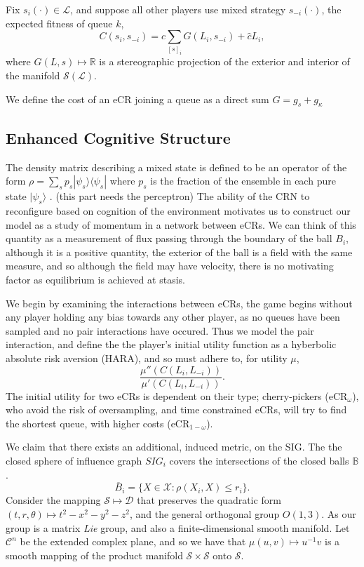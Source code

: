 \documentclass[10pt]{article}
\newcommand{\mcL}{\mathcal{L}}
\newcommand{\mcX}{\mathcal{X}}
\newcommand{\mcC}{\mathcal{C}}
\newcommand{\mcS}{\mathcal{S}}
\newcommand{\mcD}{\mathcal{D}}
\theoremstyle{definition}
\begin{document}
{Fix $s_i(\cdot) \in \mcL$, and suppose all other players use mixed strategy
$s_{-i}(\cdot)$, the expected fitness of queue $k$, 
$$
   C(s_i, s_{-i}) = c\displaystyle\sum_{[s]_i} G(L_i, s_{-i}) + \hat c L_i,
$$
where $G(L,s)\mapsto \mathbb{R}$ is a stereographic projection of the
exterior and interior of the manifold $\mcS(\mcL)$. 

We define the cost of an eCR joining a queue as a direct sum $G = g_s + g_\kappa$



\subsection{Enhanced Cognitive Structure}

The density matrix describing a mixed state is defined to be an operator of the form
$\rho =\sum _{s}p_{s}|\psi _{s}\rangle \langle \psi _{s}|$
where $p_{s}$ is the fraction of the ensemble in each pure
state $|\psi _{s}\rangle$ .
(this part needs the perceptron)
The ability of the CRN to reconfigure based on cognition of the environment
motivates us to construct our model as a study of momentum in a network between eCRs. 
We can think of this quantity as a measurement of flux passing through the
boundary of the ball $B_i$, although it is a positive quantity, the exterior of
the ball is a field with the same measure, and so although the field may have
velocity, there is no motivating factor as equilibrium is achieved at stasis.

We begin by examining the interactions between eCRs, the game begins without any
player holding any bias towards any other player, as no queues have been
sampled and no pair interactions have occured.
Thus we model the pair interaction, and define the the player's initial utility
function as a hyberbolic absolute risk aversion (HARA), and so must adhere to,
for utility $\mu$,
$$
    \displaystyle\frac{\mu''(C(L_i,L_{-i}))}{\mu'(C(L_i,L_{-i}))}.
$$
The initial utility for two eCRs is dependent on their type; cherry-pickers
(eCR$_{\omega}$), who
avoid the risk of oversampling, and time constrained eCRs, will try to
find the shortest queue, with higher costs (eCR$_{1-\omega}$).

We claim that there exists an additional, induced metric, on the
SIG. The the closed sphere of influence graph $SIG_i$ covers the intersections
of the closed balls $\mathbb{B}$.
$$
    \overline{B}_i= \lbrace X \in \mcX : \rho(X_i, X) \le r_i\rbrace.
$$
Consider the mapping $\mcS\mapsto \mcD$ that preserves the quadratic form $(t, r,
 \theta)\mapsto t^2-x^2-y^2-z^2$, and the general orthogonal group
 $O(1,3)$. As our group is a matrix \emph{Lie} group, and also a finite-dimensional
 smooth manifold. Let $\mcC^n$ be the extended complex plane, and so we have
 that $\mu(u,v) \mapsto u^{-1}v$ is a smooth mapping of the product manifold  $\mcS\times\mcS$ onto $\mcS$.


}
\end{document}
